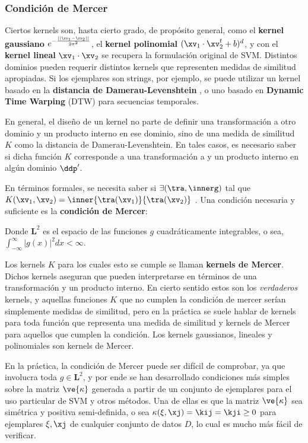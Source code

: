 \subsubsection{Condición de Mercer}

Ciertos kernels son, hasta cierto grado, de propósito general, como el \textbf{kernel gaussiano} $e^{- \frac{|| \xv_1-\xv_2||}{2 \sigma^2} }$, el \textbf{kernel polinomial} $(\xv_1 \cdot \xv_2^t + b)^d$, y con el \textbf{kernel lineal} $\xv_1 \cdot \xv_2$ se recupera la formulación original de SVM. Distintos dominios pueden requerir distintos kernels que representen medidas de similitud apropiadas. Si los ejemplares son strings, por ejemplo, se puede utilizar un kernel basado en la \textbf{distancia de Damerau-Levenshtein} \cite{Damerau1964}, o uno basado en \textbf{Dynamic Time Warping} (DTW) \cite{Bellman1959} para secuencias temporales.


En general, el diseño de un kernel no parte de definir una transformación a otro dominio y un producto interno en ese dominio, sino de una medida de similitud $K$ como la distancia de Damerau-Levenshtein. En tales casos, es necesario saber si dicha función $K$ corresponde a una transformación a y un producto interno en algún dominio $\ddp'$. 

En términos formales, se necesita saber si $\exists (\tra, \innerg)$ tal que $K(\xv_1,\xv_2) = \inner{\tra(\xv_1)}{\tra(\xv_2)}$ . Una condición necesaria y suficiente es la \textbf{condición de Mercer}:


Donde $\mathbf{L}^2$ es el espacio de las funciones $g$ cuadráticamente integrables, o sea, $\int_{-\infty}^{\infty} |g(x)|^2 dx < \infty$. 

Los kernels $K$ para los cuales esto se cumple se llaman \textbf{kernels de Mercer}.  Dichos kernels aseguran que pueden interpretarse en términos de una transformación y un producto interno. En cierto sentido estos son los \textit{verdaderos} kernels, y aquellas funciones $K$ que no cumplen la condición de mercer serían simplemente medidas de similitud, pero en la práctica se suele hablar de kernels para toda función que representa una medida de similitud y kernels de Mercer para aquellos que cumplen la condición. Los kernels gaussianos, lineales y polinomiales son kernels de Mercer.
 
En la práctica, la condición de Mercer puede ser difícil de comprobar, ya que involucra toda $g \in \mathbf{L}^2$, y por ende se han desarrollado condiciones más simples sobre la matriz $\ve{\kappa}$ generada a partir de un conjunto de ejemplares para el uso particular de SVM y otros métodos. Una de ellas es que la matriz $\ve{\kappa}$ sea simétrica y positiva semi-definida, o sea $\kappa(\xi,\xj)=\kij=\kji \geq 0$ para ejemplares $\xi,\xj$ de cualquier conjunto de datos $D$, lo cual es mucho más fácil de verificar.

